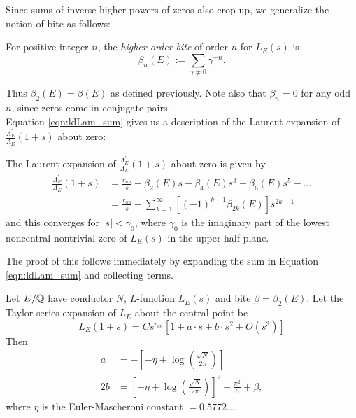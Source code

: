 \documentclass[10pt]{article}
\newcommand{\pr}{^{\prime}}
\newcommand{\Les}{L_E(s)}
\newcommand{\ldLam}[1]{\frac{\Lambda_E\pr}{\Lambda_E}\left(#1\right)}
\begin{document}
Since sums of inverse higher powers of zeros also crop up, we generalize the notion of bite as follows:
\begin{definition}
For positive integer $n$, the {\it higher order bite} of order $n$ for $\Les$ is
\begin{equation}
\beta_n(E) := \sum_{\gamma \ne 0} \gamma^{-n}.
\end{equation}
\end{definition}
Thus $\beta_2(E) = \beta(E)$ as defined previously. Note also that $\beta_n = 0$ for any odd $n$, since zeros come in conjugate pairs. \\

Equation \ref{eqn:ldLam_sum} gives us a description of the Laurent expansion of $\ldLam{1+s}$ about zero:
\begin{corollary}\label{cor:ldLam_series_at_zero}
The Laurent expansion of $\ldLam{1+s}$ about zero is given by
\begin{align}
\ldLam{1+s} &= \frac{r_{an}}{s} + \beta_2(E) s - \beta_4(E) s^3 + \beta_6(E) s^5 - \ldots \\
& = \frac{r_{an}}{s} + \sum_{k=1}^{\infty} \left[(-1)^{k-1}\beta_{2k}(E)\right] s^{2k-1}
\end{align}
and this converges for $|s|<\gamma_0$, where $\gamma_0$ is the imaginary part of the lowest noncentral nontrivial zero of $\Les$ in the upper half plane.
\end{corollary}
The proof of this follows immediately by expanding the sum in Equation \ref{eqn:ldLam_sum} and collecting terms. \\

\begin{corollary}\label{cor:ldLe_expansion}
Let $E/\mathbb{Q}$ have conductor $N$, $L$-function $\Les$ and bite $\beta = \beta_2(E)$. Let the Taylor series expansion of $L_E$ about the central point be
\begin{equation}
L_E(1+s) = Cs^{r_{an}}\left[1 + a\cdot s + b\cdot s^2 + O(s^3)\right]
\end{equation}
Then 
\begin{align}
a &= -\left[-\eta + \log\left(\frac{\sqrt{N}}{2\pi}\right)\right] \\
2b &= \left[-\eta + \log\left(\frac{\sqrt{N}}{2\pi}\right)\right]^2 - \frac{\pi^2}{6} + \beta,
\end{align}
where $\eta$ is the Euler-Mascheroni constant $= 0.5772\ldots$.
\end{corollary}
\end{document}
